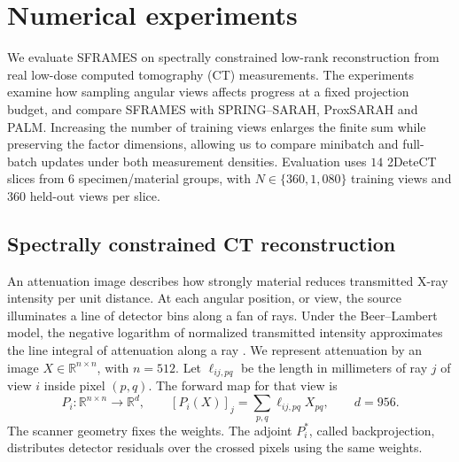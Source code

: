 \section{Numerical experiments}
\label{sec:ct-experiments}

We evaluate SFRAMES on spectrally constrained low-rank reconstruction from
real low-dose computed tomography (CT) measurements. The experiments examine
how sampling angular views affects progress at a fixed projection budget,
and compare SFRAMES with SPRING--SARAH, ProxSARAH and PALM. Increasing the
number of training views enlarges the finite sum while preserving the factor
dimensions, allowing us to compare minibatch and full-batch updates under
both measurement densities.
Evaluation uses \(14\) 2DeteCT slices from \(6\) specimen/material groups, with \(N\in\{360,1{,}080\}\) training views and \(360\) held-out views per slice.

\subsection{Spectrally constrained CT reconstruction}
\label{subsec:ct-model}

An attenuation image describes how strongly material reduces transmitted
X-ray intensity per unit distance. At each angular position, or view, the
source illuminates a line of detector bins along a fan of rays. Under the
Beer--Lambert model, the negative logarithm of normalized transmitted
intensity approximates the line integral of attenuation along a ray
\cite{detect}. We represent attenuation by an image
\(X\in\mathbb R^{n\times n}\), with \(n=512\). Let
\(\ell_{ij,pq}\) be the length in millimeters of ray \(j\) of view \(i\)
inside pixel \((p,q)\). The forward map for that view is
\begin{equation}
 P_i\colon\mathbb R^{n\times n}\longrightarrow\mathbb R^d,
 \qquad [P_i(X)]_j=\sum_{p,q}\ell_{ij,pq}X_{pq},\qquad d=956.
 \label{eq:ct-ray}
\end{equation}
The scanner geometry fixes the weights. The adjoint \(P_i^\ast\), called
backprojection, distributes detector residuals over the crossed pixels
using the same weights.

